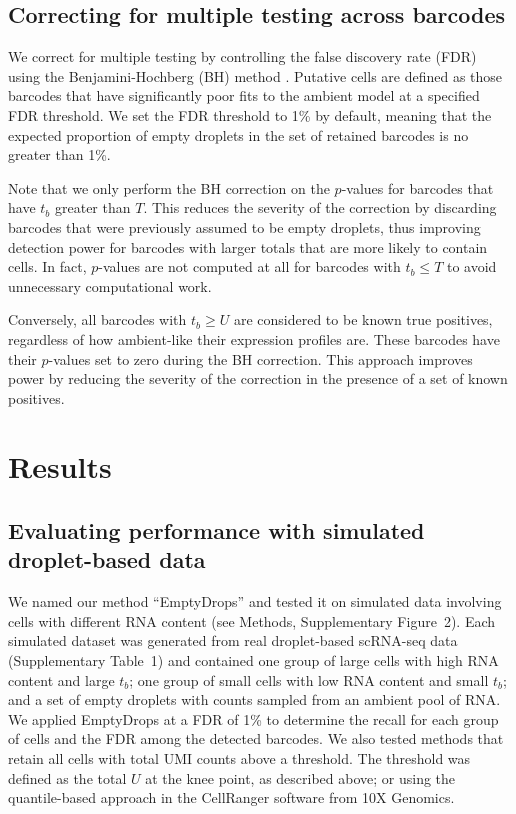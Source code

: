 \documentclass[10pt,letterpaper]{article}
\newcommand{\supptabdataset}{1}
\newcommand{\suppfigsimdesign}{2}
\begin{document}
\subsection*{Correcting for multiple testing across barcodes}
We correct for multiple testing by controlling the false discovery rate (FDR) using the Benjamini-Hochberg (BH) method \cite{benjamini1995controlling}.
Putative cells are defined as those barcodes that have significantly poor fits to the ambient model at a specified FDR threshold.
We set the FDR threshold to 1\% by default, meaning that the expected proportion of empty droplets in the set of retained barcodes is no greater than 1\%.

Note that we only perform the BH correction on the $p$-values for barcodes that have $t_b$ greater than $T$.
This reduces the severity of the correction by discarding barcodes that were previously assumed to be empty droplets, thus improving detection power for barcodes with larger totals that are more likely to contain cells.
In fact, $p$-values are not computed at all for barcodes with $t_b \le T$ to avoid unnecessary computational work.

Conversely, all barcodes with $t_b \ge U$ are considered to be known true positives, regardless of how ambient-like their expression profiles are.
These barcodes have their $p$-values set to zero during the BH correction.
This approach improves power by reducing the severity of the correction in the presence of a set of known positives.

\section*{Results}

\subsection*{Evaluating performance with simulated droplet-based data}
We named our method ``EmptyDrops'' and tested it on simulated data involving cells with different RNA content (see Methods, Supplementary Figure~\suppfigsimdesign{}).
Each simulated dataset was generated from real droplet-based scRNA-seq data (Supplementary Table~\supptabdataset{}) 
and contained one group of large cells with high RNA content and large $t_b$;
one group of small cells with low RNA content and small $t_b$; 
and a set of empty droplets with counts sampled from an ambient pool of RNA.
We applied EmptyDrops at a FDR of 1\% to determine the recall for each group of cells and the FDR among the detected barcodes.
We also tested methods that retain all cells with total UMI counts above a threshold.
The threshold was defined as the total $U$ at the knee point, as described above;
or using the quantile-based approach \cite{zheng2017massively} in the CellRanger software from 10X Genomics.
\end{document}
